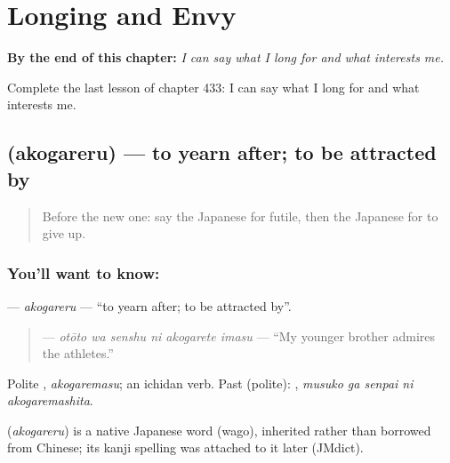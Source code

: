 
\chapter{Longing and Envy}
\label{ch:ja-longing-and-envy}

\begin{chapteropening}
\textbf{By the end of this chapter:} \emph{I can say what I long for and what interests me.}

Complete the last lesson of chapter 433: I can say what I long for and what interests me.
\end{chapteropening}

\section[\texorpdfstring{\ja{あこがれる} (akogareru)}{あこがれる (akogareru)}]{ (akogareru) — to yearn after; to be attracted by}

\label{lesson:JA-C433-akogareru}



\begin{quote}
Before the new one: say the Japanese for futile, then the Japanese for to give up.
\end{quote}

\subsection*{You'll want to know: }
\textbf{} — \emph{akogareru} — \textquotedblleft{}to yearn after; to be attracted by\textquotedblright{}.

\begin{quote}
\textbf{  } — \emph{otōto wa senshu ni akogarete imasu} — \textquotedblleft{}My younger brother admires the athletes.\textquotedblright{}
\end{quote}

Polite \textbf{}, \emph{akogaremasu}; an ichidan verb. Past (polite): \textbf{  }, \emph{musuko ga senpai ni akogaremashita}.

\begin{cousinweb}
\textbf{} (\emph{akogareru}) is a native Japanese word (wago), inherited rather than borrowed from Chinese; its kanji spelling was attached to it later (JMdict).
\end{cousinweb}

